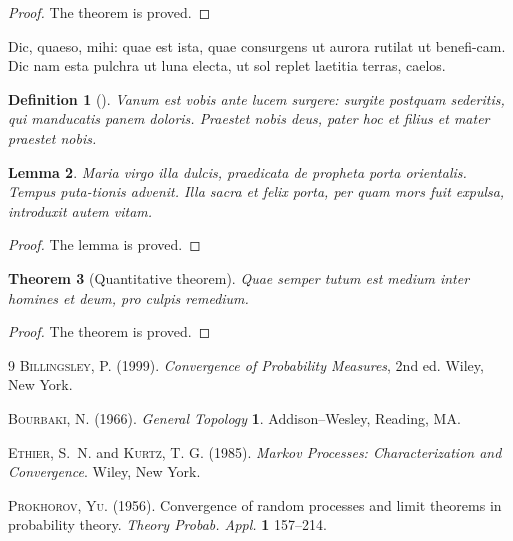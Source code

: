 \documentclass{sili}
\newtheorem{thm}{Theorem}[section]
\newtheorem{defn}[thm]{Definition}
\newtheorem{lem}[thm]{Lemma}
\begin{document}
\begin{proof}
The theorem is proved.
\end{proof}

Dic, quaeso, mihi: quae est ista, quae consurgens ut aurora rutilat
ut benefi-cam.  Dic nam esta pulchra ut luna electa, ut sol replet
laetitia terras, caelos.

\begin{defn}[\cite{r1}]\label{clas}
Vanum est vobis ante lucem surgere: surgite postquam
sederitis, qui manducatis panem doloris. Praestet nobis deus, pater
hoc et filius et mater praestet nobis.
\end{defn}

\begin{lem}
Maria virgo illa dulcis, praedicata de
propheta porta orientalis. Tempus puta-tionis advenit. Illa sacra et
felix porta, per quam mors fuit expulsa, introduxit autem vitam.
\end{lem}

\begin{proof}
The lemma is proved.
\end{proof}

\begin{thm}[Quantitative theorem]
Quae semper tutum est medium inter homines et deum, pro culpis remedium.
\end{thm}

\begin{proof}
The theorem is proved.
\end{proof}

\begin{thebibliography}{9}
\textsc{Billingsley, P.} (1999). \textit{Convergence of
Probability Measures}, 2nd ed.
Wiley, New York.

\textsc{Bourbaki, N.}  (1966). \textit{General Topology}  \textbf{1}.
Addison--Wesley, Reading, MA.

\textsc{Ethier, S.~N.} and \textsc{Kurtz, T. G.} (1985).
\textit{Markov Processes: Characterization and Convergence}.
Wiley, New York.

\textsc{Prokhorov, Yu.} (1956).
Convergence of random processes and limit theorems in probability
theory. \textit{Theory  Probab.  Appl.}
\textbf{1} 157--214.

\end{thebibliography}
\end{document}
